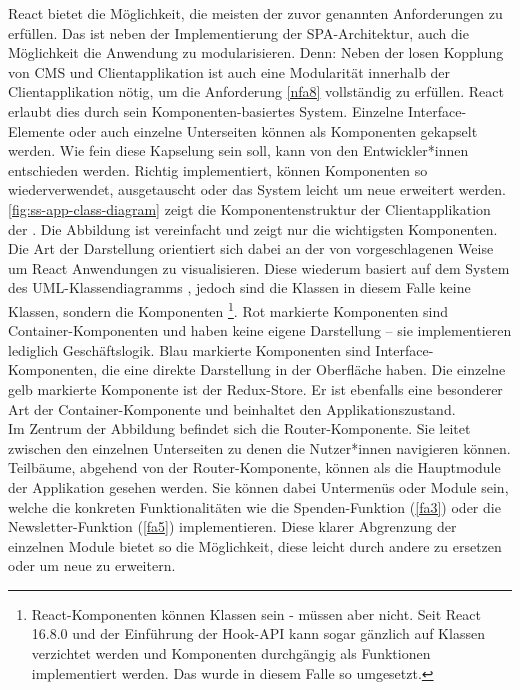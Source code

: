 React bietet die Möglichkeit, die meisten der zuvor genannten Anforderungen zu erfüllen. 
Das ist neben der Implementierung der SPA-Architektur, auch die Möglichkeit die 
Anwendung zu modularisieren. Denn: Neben der losen Kopplung von CMS und Clientapplikation
ist auch eine Modularität innerhalb der Clientapplikation nötig, um die Anforderung \ref{nfa8}
vollständig zu erfüllen. React erlaubt dies durch sein Komponenten-basiertes System. Einzelne
Interface-Elemente oder auch einzelne Unterseiten können als Komponenten gekapselt werden.
Wie fein diese Kapselung sein soll, kann von den Entwickler*innen entschieden werden. Richtig implementiert,
können Komponenten so wiederverwendet, ausgetauscht oder das System leicht um neue erweitert werden.\\
\autoref{fig:ss-app-class-diagram} zeigt die Komponentenstruktur der Clientapplikation der \shst{}.
Die Abbildung ist vereinfacht und zeigt nur die wichtigsten Komponenten. Die Art der Darstellung
orientiert sich dabei an der von  vorgeschlagenen Weise um React Anwendungen
zu visualisieren. Diese wiederum basiert auf dem System des UML-Klassendiagramms \cite{uml-spec}, 
jedoch sind die Klassen in diesem Falle keine Klassen, sondern die Komponenten 
\footnote{React-Komponenten können Klassen sein - müssen aber nicht. Seit React 16.8.0 und
der Einführung der Hook-API \cite{react-hooks} kann sogar gänzlich auf Klassen verzichtet werden und Komponenten 
durchgängig als Funktionen implementiert werden. Das wurde in diesem Falle so umgesetzt.}.
Rot markierte Komponenten sind Container-Komponenten und haben keine eigene Darstellung -- sie implementieren 
lediglich Geschäftslogik. Blau markierte Komponenten sind Interface-Komponenten, die eine direkte 
Darstellung in der Oberfläche haben. Die einzelne gelb markierte Komponente ist der Redux-Store. 
Er ist ebenfalls eine besonderer Art der Container-Komponente und beinhaltet den Applikationszustand. 
\\
Im Zentrum der Abbildung befindet sich die Router-Komponente. Sie leitet zwischen den einzelnen Unterseiten
zu denen die Nutzer*innen navigieren können. Teilbäume, abgehend von der Router-Komponente, können als
die Hauptmodule der Applikation gesehen werden. Sie können dabei Untermenüs oder Module sein, welche
die konkreten Funktionalitäten wie die Spenden-Funktion (\ref{fa3}) oder die Newsletter-Funktion (\ref{fa5}) 
implementieren. Diese klarer Abgrenzung der einzelnen Module bietet so die Möglichkeit, diese leicht
durch andere zu ersetzen oder um neue zu erweitern.\\

